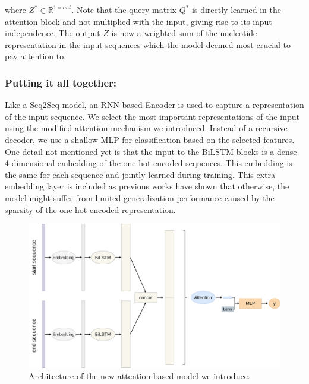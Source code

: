 
where $Z^* \in \mathbb{R}^{1 \times out}$. Note that the query matrix ${Q}^*$ is directly learned in the attention block and not multiplied with the input, giving rise to its input independence. The output $Z$ is now a weighted sum of the nucleotide representation in the input sequences which the model deemed most crucial to pay attention to.
\subsubsection{Putting it all together:} 
Like a Seq2Seq model, an RNN-based Encoder is used to capture a representation of the input sequence. We select the most important representations of the input using the modified attention mechanism we introduced. Instead of a recursive decoder, we use a shallow MLP for classification based on the selected features.
One detail not mentioned yet is that the input to the BiLSTM blocks is a dense 4-dimensional embedding of the one-hot encoded sequences. This embedding is the same for each sequence and jointly learned during training. This extra embedding layer is included as previous works \cite{embeddingneeded} have shown that otherwise, the model might suffer from limited generalization performance caused by the sparsity of the one-hot encoded representation. 

\begin{figure}
	\centering\includegraphics[width=1\textwidth]{../visualizations/ch4-methods/visualizations-AttnBiLSTM.pdf} 
	\caption{Architecture of the new attention-based model we introduce. }
	\label{fig:attnbilstm}
\end{figure}

